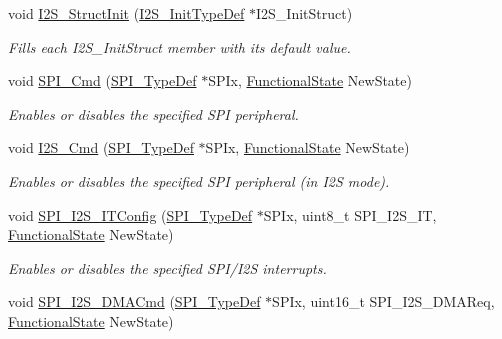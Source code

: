 \begin{DoxyCompactItemize}
void \hyperlink{group___s_p_i___exported___functions_ga7470ec1d0759fdeeb42c7fe71a3b41b7}{I2\+S\+\_\+\+Struct\+Init} (\hyperlink{struct_i2_s___init_type_def}{I2\+S\+\_\+\+Init\+Type\+Def} $\ast$I2\+S\+\_\+\+Init\+Struct)
\begin{DoxyCompactList}\small\item\em Fills each I2\+S\+\_\+\+Init\+Struct member with its default value. \end{DoxyCompactList}\item 
void \hyperlink{group___s_p_i___exported___functions_gaa31357879a65ee1ed7223f3b9114dcf3}{S\+P\+I\+\_\+\+Cmd} (\hyperlink{struct_s_p_i___type_def}{S\+P\+I\+\_\+\+Type\+Def} $\ast$S\+P\+Ix, \hyperlink{group___exported__types_gac9a7e9a35d2513ec15c3b537aaa4fba1}{Functional\+State} New\+State)
\begin{DoxyCompactList}\small\item\em Enables or disables the specified S\+PI peripheral. \end{DoxyCompactList}\item 
void \hyperlink{group___s_p_i___exported___functions_gafe061c71bbc5b4224f3f2884dc53739e}{I2\+S\+\_\+\+Cmd} (\hyperlink{struct_s_p_i___type_def}{S\+P\+I\+\_\+\+Type\+Def} $\ast$S\+P\+Ix, \hyperlink{group___exported__types_gac9a7e9a35d2513ec15c3b537aaa4fba1}{Functional\+State} New\+State)
\begin{DoxyCompactList}\small\item\em Enables or disables the specified S\+PI peripheral (in I2S mode). \end{DoxyCompactList}\item 
void \hyperlink{group___s_p_i___exported___functions_ga17f4ef132e8ddbf94cb6b1688d181e41}{S\+P\+I\+\_\+\+I2\+S\+\_\+\+I\+T\+Config} (\hyperlink{struct_s_p_i___type_def}{S\+P\+I\+\_\+\+Type\+Def} $\ast$S\+P\+Ix, uint8\+\_\+t S\+P\+I\+\_\+\+I2\+S\+\_\+\+IT, \hyperlink{group___exported__types_gac9a7e9a35d2513ec15c3b537aaa4fba1}{Functional\+State} New\+State)
\begin{DoxyCompactList}\small\item\em Enables or disables the specified S\+P\+I/\+I2S interrupts. \end{DoxyCompactList}\item 
void \hyperlink{group___s_p_i___exported___functions_gabed5b91a8576e6d578f364cc0e807e4a}{S\+P\+I\+\_\+\+I2\+S\+\_\+\+D\+M\+A\+Cmd} (\hyperlink{struct_s_p_i___type_def}{S\+P\+I\+\_\+\+Type\+Def} $\ast$S\+P\+Ix, uint16\+\_\+t S\+P\+I\+\_\+\+I2\+S\+\_\+\+D\+M\+A\+Req, \hyperlink{group___exported__types_gac9a7e9a35d2513ec15c3b537aaa4fba1}{Functional\+State} New\+State)

\end{DoxyCompactItemize}
